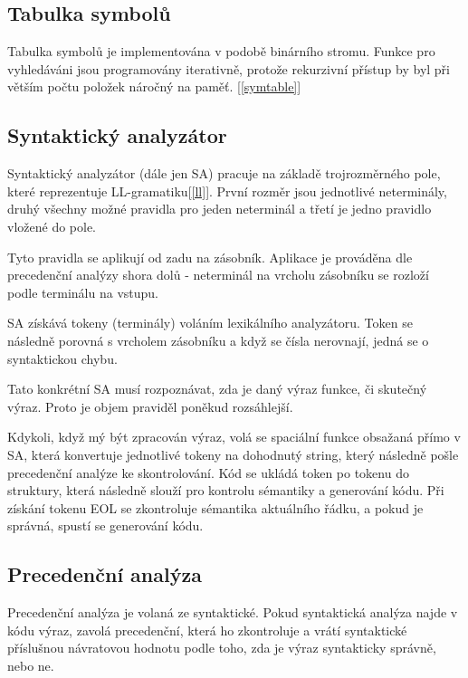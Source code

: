 \documentclass[11pt, a4paper]{article}
\begin{document}
	\subsection{Tabulka symbolů}
    Tabulka symbolů je implementována v podobě binárního stromu. Funkce pro vyhledáváni jsou programovány iterativně, protože rekurzivní přístup by byl při větším počtu položek náročný na paměť. [\ref{symtable}]
		
	
         

	\subsection{Syntaktický analyzátor}
	Syntaktický analyzátor (dále jen SA) pracuje na základě trojrozměrného pole, které reprezentuje LL-gramatiku[\ref{ll}]. První rozměr jsou jednotlivé neterminály, druhý všechny možné pravidla pro jeden neterminál a třetí je jedno pravidlo vložené do pole.
	
		Tyto pravidla se aplikují od zadu na zásobník. Aplikace je prováděna dle precedenční analýzy shora dolů - neterminál na vrcholu zásobníku se rozloží podle terminálu na vstupu. 
		
		SA získává tokeny (terminály) voláním lexikálního analyzátoru. Token se následně porovná s vrcholem zásobníku a když se čísla nerovnají, jedná se o syntaktickou chybu.
		
		Tato konkrétní SA musí rozpoznávat, zda je daný výraz funkce, či skutečný výraz. Proto je objem praviděl poněkud rozsáhlejší. 
		
		Kdykoli, když mý být zpracován výraz, volá se spaciální funkce obsažaná přímo v SA, která konvertuje jednotlivé tokeny na dohodnutý string, který následně pošle precedenční analýze ke skontrolování. 
		Kód se ukládá token po tokenu do struktury, která následně slouží pro kontrolu sémantiky a generování kódu. Při získání tokenu EOL se zkontroluje sémantika aktuálního řádku, a pokud je správná, spustí se generování kódu.

		

\subsection{Precedenční analýza}

Precedenční analýza je volaná ze syntaktické. Pokud syntaktická analýza najde v kódu výraz, zavolá precedenční, která ho zkontroluje a vrátí syntaktické příslušnou návratovou hodnotu podle toho, zda je výraz syntakticky správně, nebo ne.
\end{document}
